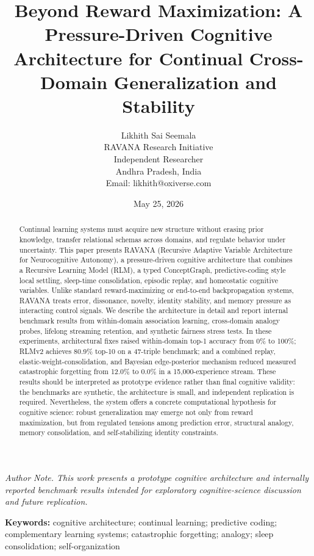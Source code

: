 \documentclass[11pt]{article}
\title{Beyond Reward Maximization: A Pressure-Driven Cognitive Architecture for Continual Cross-Domain Generalization and Stability}
\author{Likhith Sai Seemala\\RAVANA Research Initiative\\Independent Researcher\\Andhra Pradesh, India\\Email: likhith@oxiverse.com}
\date{May 25, 2026}
\begin{document}
\maketitle

\begin{center}
\textit{Author Note. This work presents a prototype cognitive architecture and internally reported benchmark results intended for exploratory cognitive-science discussion and future replication.}
\end{center}

\begin{abstract}
Continual learning systems must acquire new structure without erasing prior knowledge, transfer relational schemas across domains, and regulate behavior under uncertainty. This paper presents RAVANA (Recursive Adaptive Variable Architecture for Neurocognitive Autonomy), a pressure-driven cognitive architecture that combines a Recursive Learning Model (RLM), a typed ConceptGraph, predictive-coding style local settling, sleep-time consolidation, episodic replay, and homeostatic cognitive variables. Unlike standard reward-maximizing or end-to-end backpropagation systems, RAVANA treats error, dissonance, novelty, identity stability, and memory pressure as interacting control signals. We describe the architecture in detail and report internal benchmark results from within-domain association learning, cross-domain analogy probes, lifelong streaming retention, and synthetic fairness stress tests. In these experiments, architectural fixes raised within-domain top-1 accuracy from 0\% to 100\%; RLMv2 achieves 80.9\% top-10 on a 47-triple benchmark; and a combined replay, elastic-weight-consolidation, and Bayesian edge-posterior mechanism reduced measured catastrophic forgetting from 12.0\% to 0.0\% in a 15,000-experience stream. These results should be interpreted as prototype evidence rather than final cognitive validity: the benchmarks are synthetic, the architecture is small, and independent replication is required. Nevertheless, the system offers a concrete computational hypothesis for cognitive science: robust generalization may emerge not only from reward maximization, but from regulated tensions among prediction error, structural analogy, memory consolidation, and self-stabilizing identity constraints.
\end{abstract}

\textbf{Keywords:} cognitive architecture; continual learning; predictive coding; complementary learning systems; catastrophic forgetting; analogy; sleep consolidation; self-organization
\end{document}
